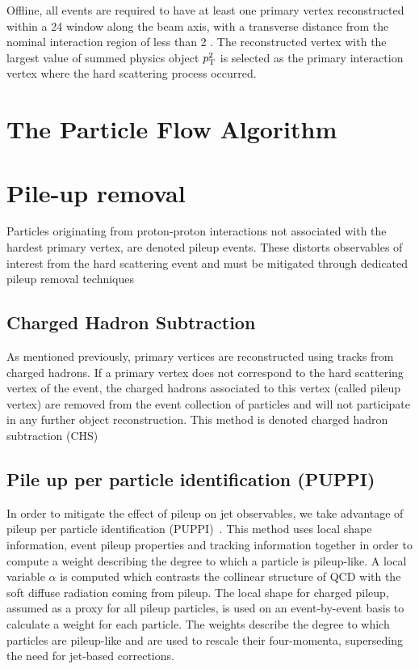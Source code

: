 Offline, all events are required to have at least one primary vertex reconstructed within a 24 \cm window along the beam axis, with a transverse distance from the nominal interaction region of less than 2 \cm. The reconstructed vertex with the largest value of summed physics object $p_{\mathrm{T}}^2$ is selected as the primary interaction vertex where the hard scattering process occurred.

\section{The Particle Flow Algorithm}


\section{Pile-up removal}

Particles originating from proton-proton interactions not associated with the hardest primary vertex, are denoted pileup events.
These distorts observables of interest from the hard scattering event and must be mitigated through dedicated pileup removal techniques

\subsection{Charged Hadron Subtraction}
As mentioned previously, primary vertices are reconstructed using tracks from charged hadrons. If a primary vertex does not correspond to the hard scattering vertex of the event, the charged hadrons associated to this vertex (called pileup vertex) are removed from the event collection of particles and will not participate in any further object reconstruction. This method is denoted charged hadron subtraction (CHS)

\subsection{Pile up per particle identification (PUPPI)}
In order to mitigate the effect of pileup on jet observables, we take advantage of pileup per particle identification (PUPPI)~\cite{Bertolini2014}.
This method uses local shape information, event pileup properties and tracking information
together in order to compute a weight describing the degree to which a particle is pileup-like.
A local variable $\alpha$ is computed which contrasts the collinear structure of QCD with the soft diffuse radiation coming from pileup.  
The local shape for charged pileup, assumed as a proxy for all pileup particles, is used on an event-by-event basis to calculate a weight for each particle. The weights describe the degree to which particles are pileup-like and are used to rescale their four-momenta, superseding the need for jet-based corrections.


